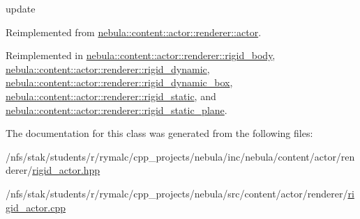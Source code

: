 update 

Reimplemented from \hyperlink{classnebula_1_1content_1_1actor_1_1renderer_1_1actor_aec0ddac9c76aa3360fe97b49a651e1e2}{nebula::content::actor::renderer::actor}.

Reimplemented in \hyperlink{classnebula_1_1content_1_1actor_1_1renderer_1_1rigid__body_a11f37d90346888f7dc70cae54954a584}{nebula::content::actor::renderer::rigid\_\-body}, \hyperlink{classnebula_1_1content_1_1actor_1_1renderer_1_1rigid__dynamic_a53122ec3edecc185ebe31a8bb38be920}{nebula::content::actor::renderer::rigid\_\-dynamic}, \hyperlink{classnebula_1_1content_1_1actor_1_1renderer_1_1rigid__dynamic__box_af93072ba126df030c9eb4ec7d2898104}{nebula::content::actor::renderer::rigid\_\-dynamic\_\-box}, \hyperlink{classnebula_1_1content_1_1actor_1_1renderer_1_1rigid__static_a3e3b767391a538db88e91035cca7c3dd}{nebula::content::actor::renderer::rigid\_\-static}, and \hyperlink{classnebula_1_1content_1_1actor_1_1renderer_1_1rigid__static__plane_a3ef08d440181a74d4428ebef83607963}{nebula::content::actor::renderer::rigid\_\-static\_\-plane}.

The documentation for this class was generated from the following files:\begin{DoxyCompactItemize}
\item 
/nfs/stak/students/r/rymalc/cpp\_\-projects/nebula/inc/nebula/content/actor/renderer/\hyperlink{renderer_2rigid__actor_8hpp}{rigid\_\-actor.hpp}\item 
/nfs/stak/students/r/rymalc/cpp\_\-projects/nebula/src/content/actor/renderer/\hyperlink{renderer_2rigid__actor_8cpp}{rigid\_\-actor.cpp}\end{DoxyCompactItemize}
